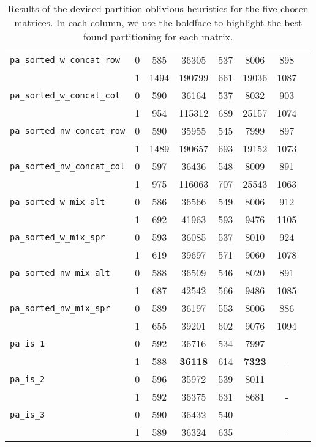 \begin{table}[h]
\begin{tabular}{|l|c||c|c|c|c|c||c|}
		\verb|pa_sorted_w_concat_row| & 0 & 585 & 36305 & 537 & 8006 & 898 \\ %
		& 1 &  1494 & 190799 & 661 & 19036 & 1087 \\ \hline
		\verb|pa_sorted_w_concat_col| & 0 & 590 & 36164 & 537 & 8032 & 903 \\ %
		& 1 &  954 & 115312 & 689 & 25157 & 1074 \\ \hline
		\verb|pa_sorted_nw_concat_row| & 0 & 590 & 35955 & 545 & 7999 & 897 \\ %
		& 1 & 1489 & 190657 & 693 & 19152 & 1073 \\ \hline
		\verb|pa_sorted_nw_concat_col| & 0  & 597 & 36436 & 548 & 8009 & 891 \\ %
		& 1 & 975 & 116063 & 707 & 25543  & 1063 \\ \hline
		\verb|pa_sorted_w_mix_alt| & 0 &  586 & 36566 & 549 & 8006  & 912 \\ %
		& 1 & 692 & 41963 & 593 & 9476 & 1105 \\ \hline
		\verb|pa_sorted_w_mix_spr| & 0 &  593 & 36085 &  537 & 8010 & 924 \\ %
		& 1 & 619 & 39697 & 571 &  9060 & 1078 \\ \hline
		\verb|pa_sorted_nw_mix_alt| & 0 & 588 & 36509 & 546 & 8020 & 891 \\ %
		& 1 &  687 & 42542 & 566 & 9486 & 1085 \\ \hline
		\verb|pa_sorted_nw_mix_spr| & 0 & 589 & 36197 & 553 &8006  & 886 \\ %
		& 1 &  655 & 39201 & 602 & 9076 & 1094 \\ \hline
		\verb|pa_is_1| & 0 & 592 & 36716 & 534 & 7997 & \\ 
		& 1 & 588 & \textbf{36118} & 614 & \textbf{7323} & - \\ \hline
		\verb|pa_is_2| & 0 & 596 & 35972 &  539 & 8011 &  \\ 
		& 1 & 592 & 36375 &  631 & 8681 & - \\ \hline
		\verb|pa_is_3| & 0 & 590 & 36432 & 540 & &\\ 
		& 1 & 589 & 36324 & 635 & & -\\ \hline

	\end{tabular}
	\caption{Results of the devised partition-oblivious heuristics for the five chosen matrices. In each column, we use the boldface to highlight the best found partitioning for each matrix. } \label{tab:preliminary_pa}
\end{table}

